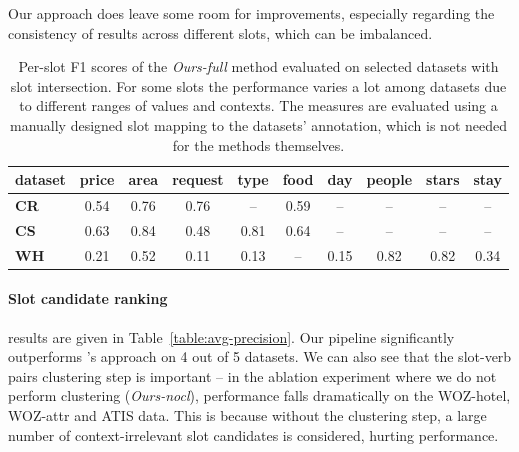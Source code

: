 Our approach does leave some room for improvements, especially regarding the consistency of results across different slots, which can be imbalanced.
\begin{table}[h]
    \centering
    \small
    \begin{tabular}{l|ccccccccc}
    \hline
    \textbf{dataset} & \textbf{price} & \textbf{area} & \textbf{request} & \textbf{type} & \textbf{food} & \textbf{day} & \textbf{people} & \textbf{stars} & \textbf{stay}
    \\ \hline
    \textbf{CR} & 0.54 & 0.76 & 0.76 & -- & 0.59 & -- & -- & -- & -- \\
    \textbf{CS} & 0.63 & 0.84 & 0.48 & 0.81 & 0.64 & -- & -- & -- & -- \\
    \textbf{WH} & 0.21 & 0.52 & 0.11 & 0.13 & -- & 0.15 & 0.82 & 0.82 & 0.34 \\
    \hline
    \end{tabular}
    
    \caption{Per-slot F1 scores of the \emph{Ours-full} method evaluated on selected datasets with slot intersection. For some slots the performance varies a lot among datasets due to different ranges of values and contexts. The measures are evaluated using a manually designed slot mapping to the datasets' annotation, which is not needed for the methods themselves.}
    \label{table:slotfilling_detail}
\end{table}

\paragraph{Slot candidate ranking}\hspace{-3mm} results are given in Table~\ref{table:avg-precision}.
Our pipeline significantly outperforms \citet{chen2014leveraging}'s approach on 4 out of 5 datasets.
We can also see that the slot-verb pairs clustering step is important -- in the ablation experiment where we do not perform clustering (\emph{Ours-nocl}),
performance falls dramatically on the WOZ-hotel, WOZ-attr and ATIS data.
This is because without the clustering step, a large number of context-irrelevant slot candidates is considered, hurting performance.

